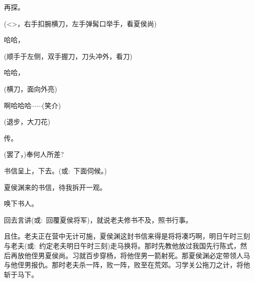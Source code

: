 {\vspace{5pt}


\vspace{5pt}



再探。


(\textless{}\!\textgreater{}，{\hwfs 右手扣腕横刀}，{\hwfs 左手弹髯口举手}，{\hwfs 看}夏侯尚)

哈哈，

({\hwfs 顺手于左侧}，{\hwfs 双手握刀}，{\hwfs 刀头冲外}，{\hwfs 看刀})

哈哈，

({\hwfs 横刀}，{\hwfs 面向外亮})

啊哈哈哈$\cdots{}\cdots{}$({\hwfs 笑介})

({\hwfs 退步}，{\hwfs 大刀花})

\vspace{5pt}



传。

(罢了，)奉何人所差?

书信呈上，下去。({\akai 或}:~下面伺候。)

夏侯渊来的书信，待我拆开一观。

唤下书人。

回去言讲({\akai 或}:~回覆夏侯将军)，就说老夫修书不及，照书行事。

且住。老夫正在营中无计可施，夏侯渊这封书信来得是将将凑巧啊，明日午时三刻与老夫({\akai 或}:~约定老夫明日午时三刻)走马换将。那时先教他放过我国先行陈式，然后再放他侄男夏侯尚。习就百步穿杨，将他侄男一箭射死。那夏侯渊必定带领人马与他侄男报仇。那时老夫杀一阵，败一阵，败至在荒郊。习学关公拖刀之计，将他斩于马下。

}
